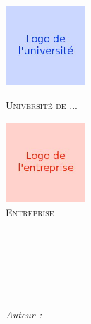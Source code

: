 %
\begin{titlepage}
    \begin{center}
        \begin{minipage}[t]{0.48\textwidth}
            \begin{flushleft}
                \includegraphics [width=30mm]{images/logo-univ.jpg} \\[0.5cm]
                \begin{spacing}{1.5}
                    \textsc{\LARGE Université de ...}
                \end{spacing}
            \end{flushleft}
        \end{minipage}
        \begin{minipage}[t]{0.48\textwidth}
            \begin{flushright}
                \includegraphics [width=30mm]{images/logo-societe.jpg} \\[0.5cm]
                \textsc{\LARGE Entreprise}
            \end{flushright}
        \end{minipage} \\[1.5cm]
        \textsc{\Large \reportsubject}\\[0.5cm]
        \HRule \\[0.4cm]
        {\huge \bfseries \reporttitle}\\[0.4cm]
        \HRule \\[1.5cm]
        \begin{minipage}[t]{0.3\textwidth}
            \begin{flushleft} \large
                \emph{Auteur :}\\
                \reportauthor
            \end{flushleft}

\end{minipage}
\end{center}
\end{titlepage}
